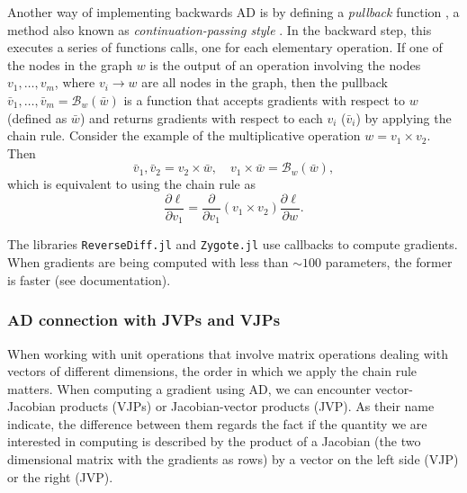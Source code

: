 Another way of implementing backwards AD is by defining a \textit{pullback} function \cite{Innes_2018}, a method also known as \textit{continuation-passing style} \cite{Wang_Zheng_Decker_Wu_Essertel_Rompf_2019}. In the backward step, this executes a series of functions calls, one for each elementary operation.
If one of the nodes in the graph $w$ is the output of an operation involving the nodes $v_1, \ldots, v_m$, where $v_i \rightarrow w$ are all nodes in the graph, then the pullback $\bar v_1, \ldots, \bar v_m = \mathcal B_w(\bar w)$ is a function that accepts gradients with respect to $w$ (defined as $\bar w$) and returns gradients with respect to each $v_i$ ($\bar v_i$) by applying the chain rule. Consider the example of the multiplicative operation $w = v_1 \times v_2$. Then
\begin{equation}
 \bar v_1, \bar v_2 = v_2 \times \bar w , \quad
 v_1 \times \bar w = \mathcal{B}_w (\bar w),
\end{equation}
which is equivalent to using the chain rule as
\begin{equation}
 \frac{\partial \ell}{\partial v_1} = \frac{\partial}{\partial v_1}(v_1 \times v_2) \frac{\partial \ell}{\partial w}.
\end{equation}

The libraries \texttt{ReverseDiff.jl} and \texttt{Zygote.jl} use callbacks to compute gradients. When gradients are being computed with less than $\sim 100$ parameters, the former is faster (see documentation).

\subsubsection{AD connection with JVPs and VJPs}

When working with unit operations that involve matrix operations dealing with vectors of different dimensions, the order in which we apply the chain rule matters. When computing a gradient using AD, we can encounter vector-Jacobian products (VJPs) or Jacobian-vector products (JVP). As their name indicate, the difference between them regards the fact if the quantity we are interested in computing is described by the product of a Jacobian (the two dimensional matrix with the gradients as rows) by a vector on the left
side (VJP) or the right (JVP).

